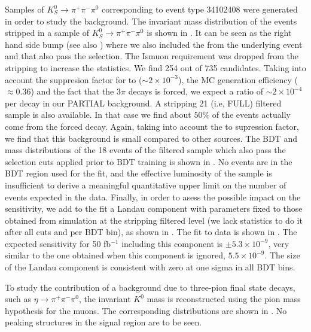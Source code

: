 Samples of $K^0_S\rightarrow\pi^+\pi^-\pi^0$ corresponding to event type 34102408 were generated in order to study the \KLTpi  background.
The invariant mass distribution of the events stripped in a sample of $K^0_S\rightarrow\pi^+\pi^-\pi^0$ is shown in . 
It can be seen as the right hand side bump (see also ) where we also included the \Kspipi from the underlying event and that also pass the selection. 
The Ismuon requirement was dropped from the stripping to increase the statistics. We find 254 \Kspipi out of 735 candidates. Taking into account the suppresion factor for \KL to \KS ($\sim2\times10^{-3}$), 
the MC generation efficiency ($\approx 0.36$) and the fact that the $3\pi$ decays is forced, we expect a ratio of $\sim2\times10^{-4}$ \KLTpi per \Kspipi decay in our PARTIAL background. 
A stripping 21 (i.e, FULL) filtered \KSTpi sample is also available. In that case we find about $50\%$  of the events actually come from the forced decay. Again, taking into account the \KL to \KS supression factor, 
we find that this background is small compared to other sources. The BDT and mass distributions of the 18 events of the filtered sample which also pass the selection cuts applied prior to BDT training is shown in 
. No events are in the BDT region used for the fit, and the effective luminosity of the sample is insufficient to derive a meaningful quantitative upper limit on the number of \KLTpi events expected 
in the data. Finally, in order to asess the possible impact on the sensitivity, we add to the fit a Landau component with parameters fixed to those obtained from simulation at the stripping filtered level (we lack 
statistics to do it after all cuts and per BDT bin), as shown in . The fit to data is shown in . The expected sensitivity for 50 fb$^{-1}$ including this component is 
$\pm5.3\times10^{-9}$, very similar to the one obtained when this component is ignored, $5.5\times10^{-9}$. The size of the Landau component is consistent with zero at one sigma in all BDT bins.


   
To study the contribution of a background due to three-pion final state decays, such as $\eta\to\pi^+\pi^-\pi^0$, the invariant $K^{0}$ mass is reconstructed using the pion mass hypothesis
for the muons. The corresponding distributions are shown in . No peaking structures in the signal region are to be seen.
   
